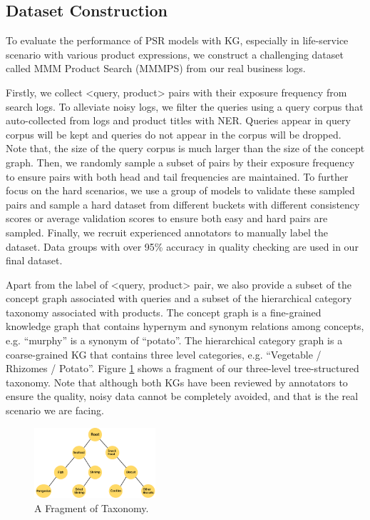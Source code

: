 \subsection{Dataset Construction}

To evaluate the performance of PSR models with KG, especially in life-service scenario with various product expressions, we construct a challenging dataset called MMM Product Search (MMMPS) from our real business logs. 

Firstly, we collect <query, product> pairs with their exposure frequency from search logs. To alleviate noisy logs, we filter the queries using a query corpus that auto-collected from logs and product titles with NER. Queries appear in query corpus will be kept and queries do not appear in the corpus will be dropped. Note that, the size of the query corpus is much larger than the size of the concept graph. Then, we randomly sample a subset of pairs by their exposure frequency to ensure pairs with both head and tail frequencies are maintained. To further focus on the hard scenarios, we use a group of models to validate these sampled pairs and sample a hard dataset from different buckets with different consistency scores or average validation scores to ensure both easy and hard pairs are sampled. Finally, we recruit experienced annotators to manually label the dataset. Data groups with over 95\% accuracy in quality checking are used in our final dataset. 

Apart from the label of <query, product> pair, we also provide a subset of the concept graph associated with queries and a subset of the hierarchical category taxonomy associated with products. The concept graph is a fine-grained knowledge graph that contains hypernym and synonym relations among concepts, e.g. ``murphy'' is a synonym of ``potato''. The hierarchical category graph is a coarse-grained KG that contains three level categories, e.g. ``Vegetable / Rhizomes / Potato''. Figure \ref{fig:taxonomy} shows a fragment of our three-level tree-structured taxonomy. Note that although both KGs have been reviewed by annotators to ensure the quality, noisy data cannot be completely avoided, and that is the real scenario we are facing.

\begin{figure}[th] \centering
    \includegraphics[width=0.4\textwidth]{taxonomy}
    \caption{A Fragment of Taxonomy.}
    \label{fig:taxonomy}
\end{figure}

